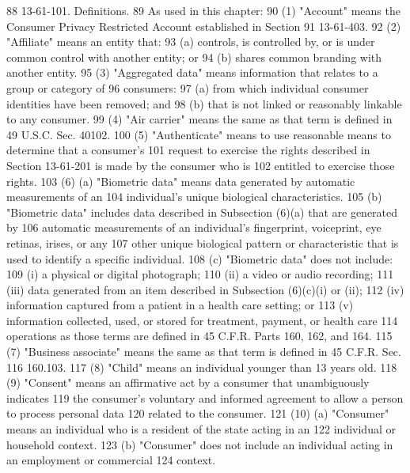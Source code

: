 88          13-61-101. Definitions.
89          As used in this chapter:
90          (1) "Account" means the Consumer Privacy Restricted Account established in Section
91     13-61-403.
92          (2) "Affiliate" means an entity that:
93          (a) controls, is controlled by, or is under common control with another entity; or
94          (b) shares common branding with another entity.
95          (3) "Aggregated data" means information that relates to a group or category of
96     consumers:
97          (a) from which individual consumer identities have been removed; and
98          (b) that is not linked or reasonably linkable to any consumer.
99          (4) "Air carrier" means the same as that term is defined in 49 U.S.C. Sec. 40102.
100          (5) "Authenticate" means to use reasonable means to determine that a consumer's
101     request to exercise the rights described in Section 13-61-201 is made by the consumer who is
102     entitled to exercise those rights.
103          (6) (a) "Biometric data" means data generated by automatic measurements of an
104     individual's unique biological characteristics.
105          (b) "Biometric data" includes data described in Subsection (6)(a) that are generated by
106     automatic measurements of an individual's fingerprint, voiceprint, eye retinas, irises, or any
107     other unique biological pattern or characteristic that is used to identify a specific individual.
108          (c) "Biometric data" does not include:
109          (i) a physical or digital photograph;
110          (ii) a video or audio recording;
111          (iii) data generated from an item described in Subsection (6)(c)(i) or (ii);
112          (iv) information captured from a patient in a health care setting; or
113          (v) information collected, used, or stored for treatment, payment, or health care
114     operations as those terms are defined in 45 C.F.R. Parts 160, 162, and 164.
115          (7) "Business associate" means the same as that term is defined in 45 C.F.R. Sec.
116     160.103.
117          (8) "Child" means an individual younger than 13 years old.
118          (9) "Consent" means an affirmative act by a consumer that unambiguously indicates
119     the consumer's voluntary and informed agreement to allow a person to process personal data
120     related to the consumer.
121          (10) (a) "Consumer" means an individual who is a resident of the state acting in an
122     individual or household context.
123          (b) "Consumer" does not include an individual acting in an employment or commercial
124     context.

